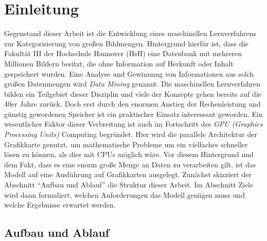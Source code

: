 \chapter{Einleitung}

Gegenstand dieser Arbeit ist die Entwicklung eines maschinellen Lernverfahrens zur Kategorisierung von großen Bildmengen. Hintergrund hierfür ist, dass die Fakultät III der Hochschule Hannover (HsH) eine Datenbank mit mehreren Millionen Bildern besitzt, die ohne Information auf Herkunft oder Inhalt gespeichert wurden. Eine Analyse und Gewinnung von Informationen aus solch großen Datenmengen wird \textit{Data Mining} genannt. Die maschinellen Lernverfahren bilden ein Teilgebiet dieser Disziplin und viele der Konzepte gehen bereits auf die 40er Jahre zurück. Doch erst durch den enormen Anstieg der Rechenleistung und günstig gewordenen Speicher ist ein praktischer Einsatz interessant geworden. 
Ein wesentlicher Faktor dieser Verbreitung ist auch im Fortschritt des \textit{GPU (Graphics Processing Units)} Computing begründet. Hier wird die parallele Architektur der Grafikkarte genutzt, um mathematische Probleme um ein vielfaches schneller lösen zu können, als dies mit CPUs möglich wäre. Vor diesem Hintergrund und dem Fakt, dass es eine enorm große Menge an Daten zu verarbeiten gilt, ist das Modell auf eine Ausführung auf Grafikkarten ausgelegt. \newline
Zunächst skizziert der Abschnitt \enquote{Aufbau und Ablauf} die Struktur dieser Arbeit. Im Abschnitt Ziele wird dann formuliert, welchen Anforderungen das Modell genügen muss und welche Ergebnisse erwartet werden.

\section{Aufbau und Ablauf}

